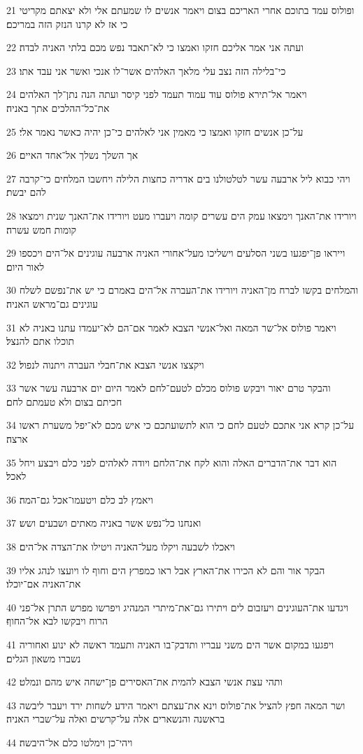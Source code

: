 \par 21 ופולוס עמד בתוכם אחרי האריכם בצום ויאמר אנשים לו שמעתם אלי ולא יצאתם מקריטי כי אז לא קרנו הנזק הזה במריכם׃
\par 22 ועתה אני אמר אליכם חזקו ואמצו כי לא־תאבד נפש מכם בלתי האניה לבדה׃
\par 23 כי־בלילה הזה נצב עלי מלאך האלהים אשר־לו אנכי ואשר אני עבד אתו׃
\par 24 ויאמר אל־תירא פולוס עוד עמוד תעמד לפני קיסר ועתה הנה נתן־לך האלהים את־כל־ההלכים אתך באניה׃
\par 25 על־כן אנשים חזקו ואמצו כי מאמין אני לאלהים כי־כן יהיה כאשר נאמר אלי׃
\par 26 אך השלך נשלך אל־אחד האיים׃
\par 27 ויהי כבוא ליל ארבעה עשר לטלטולנו בים אדריה כחצות הלילה ויחשבו המלחים כי־קרבה להם יבשת׃
\par 28 ויורידו את־האנך וימצאו עמק הים עשרים קומה ויעברו מעט ויורידו את־האנך שנית וימצאו קומות חמש עשרה׃
\par 29 וייראו פן־יפגעו בשני הסלעים וישליכו מעל־אחורי האניה ארבעה עוגינים אל־הים ויכספו לאור היום׃
\par 30 והמלחים בקשו לברח מן־האניה ויורידו את־העברה אל־הים באמרם כי יש את־נפשם לשלח עוגינים גם־מראש האניה׃
\par 31 ויאמר פולוס אל־שר המאה ואל־אנשי הצבא לאמר אם־הם לא־יעמדו עתנו באניה לא תוכלו אתם להנצל׃
\par 32 ויקצצו אנשי הצבא את־חבלי העברה ויתנוה לנפול׃
\par 33 והבקר טרם יאור ויבקש פולוס מכלם לטעם־לחם לאמר היום יום ארבעה עשר אשר חכיתם בצום ולא טעמתם לחם׃
\par 34 על־כן קרא אני אתכם לטעם לחם כי הוא לתשועתכם כי איש מכם לא־יפל משערת ראשו ארצה׃
\par 35 הוא דבר את־הדברים האלה והוא לקח את־הלחם ויודה לאלהים לפני כלם ויבצע ויחל לאכל׃
\par 36 ויאמץ לב כלם ויטעמו־אכל גם־המה׃
\par 37 ואנחנו כל־נפש אשר באניה מאתים ושבעים ושש׃
\par 38 ויאכלו לשבעה ויקלו מעל־האניה ויטילו את־הצדה אל־הים׃
\par 39 הבקר אור והם לא הכירו את־הארץ אבל ראו כמפרץ הים וחוף לו ויועצו לנהג אליו את־האניה אם־יוכלו׃
\par 40 ויגדעו את־העוגינים ויעזבום לים ויתירו גם־את־מיתרי המנהיג ויפרשו מפרש התרן אל־פני הרוח ויבקשו לבא אל־החוף׃
\par 41 ויפגעו במקום אשר הים משני עבריו ותדבק־בו האניה ותעמד ראשה לא ינוע ואחוריה נשברו משאון הגלים׃
\par 42 ותהי עצת אנשי הצבא להמית את־האסירים פן־ישחה איש מהם ונמלט׃
\par 43 ושר המאה חפץ להציל את־פולוס וינא את־עצתם ויאמר הידע לשחות ירד ויעבר ליבשה בראשנה והנשארים אלה על־קרשים ואלה על־שברי האניה׃
\par 44 ויהי־כן וימלטו כלם אל־היבשה׃


